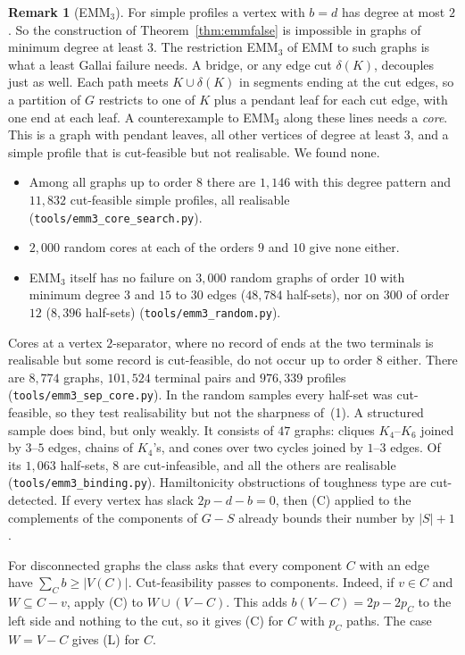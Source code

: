 \documentclass[11pt]{amsart}
\theoremstyle{definition}
\newtheorem{remark}[theorem]{Remark}
\begin{document}
\begin{remark}[EMM$_3$]\label{rem:emm3}
For simple profiles a vertex with $b=d$ has degree at most $2$. So the construction of
Theorem~\ref{thm:emmfalse} is impossible in graphs of minimum degree at least $3$. The restriction
EMM$_3$ of EMM to such graphs is what a least Gallai failure needs. A bridge, or any edge cut
$\delta(K)$, decouples just as well. Each path meets $K\cup\delta(K)$ in segments ending at the cut
edges, so a partition of $G$ restricts to one of $K$ plus a pendant leaf for each cut edge, with
one end at each leaf. A counterexample to EMM$_3$ along these lines needs a \emph{core}. This is a
graph with pendant leaves, all other vertices of degree at least $3$, and a simple profile that is
cut-feasible but not realisable. We found none.
\begin{itemize}
\item Among all graphs up to order $8$ there are $1{,}146$ with this degree pattern and
$11{,}832$ cut-feasible simple profiles, all realisable (\texttt{tools/emm3\_core\_search.py}).
\item $2{,}000$ random cores at each of the orders $9$ and $10$ give none either.
\item EMM$_3$ itself has no failure on $3{,}000$ random graphs of order $10$ with minimum degree
$3$ and $15$ to $30$ edges ($48{,}784$ half-sets), nor on $300$ of order $12$ ($8{,}396$ half-sets)
(\texttt{tools/emm3\_random.py}).
\end{itemize}
Cores at a vertex $2$-separator, where no record of ends at the two terminals is realisable but
some record is cut-feasible, do not occur up to order $8$ either. There are $8{,}774$ graphs,
$101{,}524$ terminal pairs and $976{,}339$ profiles (\texttt{tools/emm3\_sep\_core.py}). In the random
samples every half-set was cut-feasible, so they test realisability but not the sharpness of~(1).
A structured sample does bind, but only weakly. It consists of $47$ graphs: cliques $K_4$--$K_6$
joined by $3$--$5$ edges, chains of $K_4$'s, and cones over two cycles joined by $1$--$3$ edges.
Of its $1{,}063$ half-sets, $8$ are cut-infeasible, and all the others are realisable
(\texttt{tools/emm3\_binding.py}). Hamiltonicity obstructions of toughness type are cut-detected. If every vertex
has slack $2p-d-b=0$, then (C) applied to the complements of the components of $G-S$ already
bounds their number by $|S|+1$.
\end{remark}

For disconnected graphs the class asks that every component $C$ with an edge have
$\sum_Cb\ge|V(C)|$. Cut-feasibility passes to components. Indeed, if $v\in C$ and $W\subseteq C-v$,
apply (C) to $W\cup(V-C)$. This adds $b(V-C)=2p-2p_C$ to the left side and nothing to the cut, so
it gives (C) for $C$ with $p_C$ paths. The case $W=V-C$ gives (L) for $C$.
\end{document}
